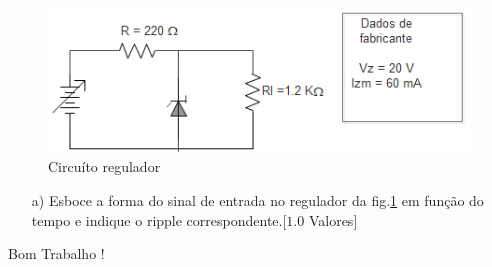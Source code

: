 \documentclass[12pt,a4paper,twoside]{report}
\begin{document}
\begin{enumerate}
\begin{figure}[H]
\centering
\includegraphics[scale=1]{cZener}
\caption{Circu\'ito regulador}
\label{f1}
\end{figure}

\begin{enumerate}
\item[a)]Esboce a forma do sinal de entrada no regulador da fig.\ref{f1} em fun\c c\~ao do tempo e indique o ripple correspondente.[$1.0$ Valores]
\end{enumerate}


\end{enumerate}

\vspace{4cm}

\Huge{Bom Trabalho !}
\end{document}
